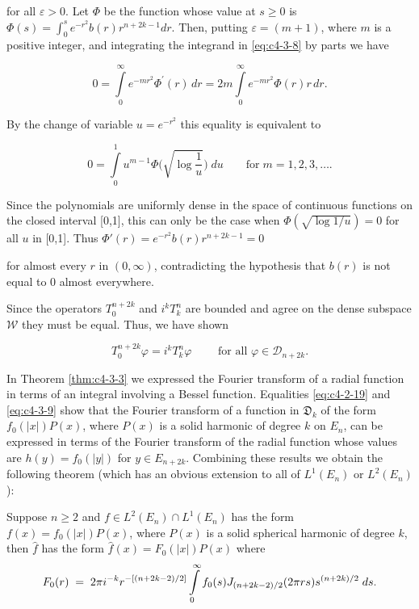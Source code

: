 for all $\varepsilon > 0$. Let $\Phi$ be the function whose value at $s \geq 0$ is $\Phi(s) = \int_0^s e^{-r^2} b(r) r^{n+2k-1} dr$. Then, putting $\varepsilon = (m+1)$, where $m$ is a positive integer, and integrating the integrand in \eqref{eq:c4-3-8} by parts we have

\[
0=\int\limits_{0}^{\infty}e^{-m r^{2}}\Phi^{\prime}(r)\,d r=2m\int\limits_{0}^{\infty}e^{-m r^{2}}\Phi(r)r\,d r.
\]

By the change of variable $u = e^{-r^2}$ this equality is equivalent to

\[
0=\int\limits_{0}^{1}u^{m-1}\Phi\biggl(\sqrt{\log\frac{1}{u}}\biggr)\;d u\qquad\text{for}\;m=1,2,3,\ldots.
\]

Since the polynomials are uniformly dense in the space of continuous functions on the closed interval [0,1], this can only be the case when $\Phi(\sqrt{\log 1/u}) = 0$ for all $u$ in [0,1]. Thus $\Phi'(r) = e^{-r^2}b(r)r^{n+2k-1} = 0$

for almost every $r$ in $(0, \infty)$, contradicting the hypothesis that $b(r)$ is not equal to 0 almost everywhere.

Since the operators $T_0^{n+2k}$ and $i^k T_k^n$ are bounded and agree on the dense subspace $\mathcal{W}$ they must be equal. Thus, we have shown

\begin{equation}\label{eq:c4-3-9}
T_{0}^{n+2k}\varphi=i^{k}T_{k}^{n}\varphi\qquad\text{ for all }\varphi\in\mathcal{D}_{n+2k}.
\end{equation}

In Theorem \ref{thm:c4-3-3} we expressed the Fourier transform of a radial function in terms of an integral involving a Bessel function. Equalities \eqref{eq:c4-2-19} and \eqref{eq:c4-3-9} show that the Fourier transform of a function in $\mathfrak{D}_k$ of the form $f_0(|x|)P(x)$, where $P(x)$ is a solid harmonic of degree $k$ on $E_n$, can be expressed in terms of the Fourier transform of the radial function whose values are $h(y) = f_0(|y|)$ for $y \in E_{n+2k}$. Combining these results we obtain the following theorem (which has an obvious extension to all of $L^1(E_n)$ or $L^2(E_n)$):

\begin{theorem}
\label{thm:c4-3-10}
Suppose $n \geq 2$ and $f \in L^2(E_n) \cap L^1(E_n)$ has the form $f(x) = f_0(|x|)P(x)$, where $P(x)$ is a solid spherical harmonic of degree $k$, then $\hat{f}$ has the form $\hat{f}(x) = F_0(|x|)P(x)$ where
\[
F_{0}(r)\;=\;2\pi i^{-k}r^{-[(n+2k-2)/2]}\intop_{0}^{\infty}f_{0}(s)J_{(n+2k-2)/2}(2\pi r s)s^{(n+2k)/2}\;d s.
\]

\end{theorem}

